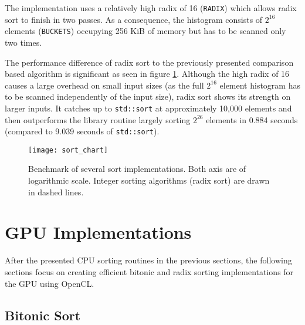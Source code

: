 

The implementation uses a relatively high radix of 16 (\lstinline!RADIX!) which allows radix sort to finish in two passes. As a consequence, the histogram consists of $2^{16}$ elements (\lstinline!BUCKETS!) occupying 256 KiB of memory but has to be scanned only two times.

The performance difference of radix sort to the previously presented comparison based algorithm is significant as seen in figure \ref{fig:sort_chart}. Although the high radix of 16 causes a large overhead on small input sizes (as the full $2^{16}$ element histogram has to be scanned independently of the input size), radix sort shows its strength on larger inputs. It catches up to \lstinline!std::sort! at approximately 10,000 elements and then outperforms the library routine largely sorting $2^{26}$ elements in 0.884 seconds (compared to 9.039 seconds of \lstinline!std::sort!).

\begin{figure}[!p]
\centering
\texttt{[image: sort\_chart]}
\caption{Benchmark of several sort implementations.
Both axis are of logarithmic scale. Integer sorting algorithms (radix sort) are drawn in dashed lines.}
\label{fig:sort_chart}
\end{figure}

\section{GPU Implementations}

After the presented CPU sorting routines in the previous sections, the following sections focus on creating efficient bitonic and radix sorting implementations for the GPU using OpenCL.

\subsection{Bitonic Sort}

